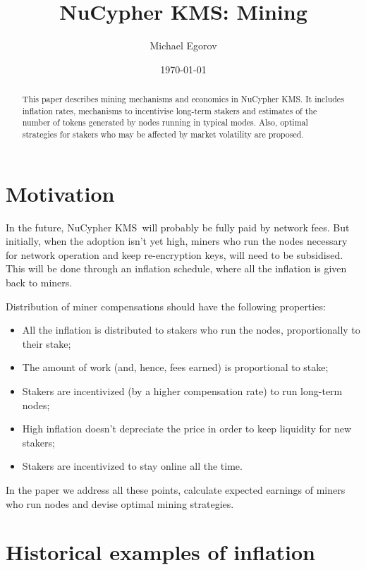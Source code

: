 \documentclass[longbibliography,nofootinbib,twocolumn]{revtex4-1}
\newcommand{\kms}{NuCypher KMS}
\begin{document}
\title{\kms: Mining}

\author{Michael Egorov}

\begin{abstract}
    This paper describes mining mechanisms and economics in \kms.
    It includes inflation rates, mechanisms to incentivise long-term stakers
    and estimates of the number of tokens generated by nodes running in typical modes.
    Also, optimal strategies for stakers who may be affected by market volatility are proposed.
\end{abstract}

\date{\today}
\maketitle

\section{Motivation}

In the future, \kms~will probably be fully paid by network fees.
But initially, when the adoption isn't yet high, miners who run the nodes necessary for network operation and keep re-encryption keys,
will need to be subsidised.
This will be done through an inflation schedule, where all the inflation is given back to miners.

Distribution of miner compensations should have the following properties:
\begin{itemize}
    \item All the inflation is distributed to stakers who run the nodes, proportionally to their stake;
    \item The amount of work (and, hence, fees earned) is proportional to stake;
    \item Stakers are incentivized (by a higher compensation rate) to run long-term nodes;
    \item High inflation doesn't depreciate the price in order to keep liquidity for new stakers;
    \item Stakers are incentivized to stay online all the time.
\end{itemize}

In the paper we address all these points, calculate expected earnings of miners who run nodes and devise optimal mining strategies.

\section{Historical examples of inflation}
\end{document}
